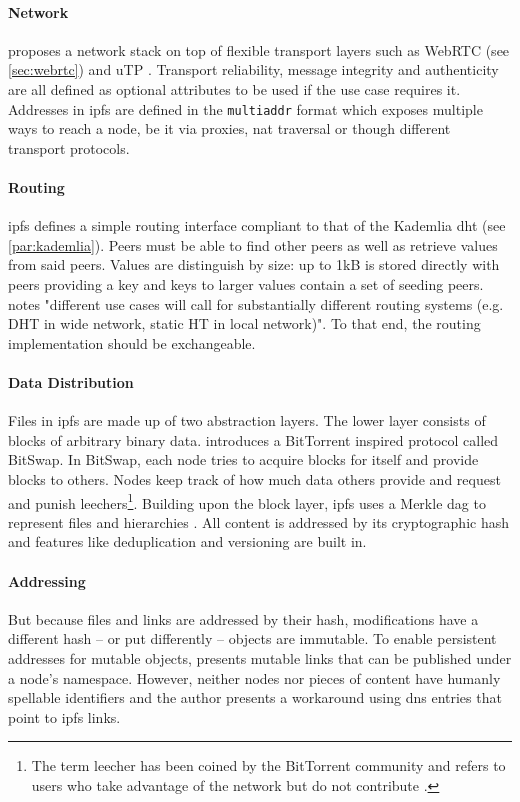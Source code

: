 \paragraph{Network}
\citet[\S3.2]{ipfs-whitepaper} proposes a network stack on top of flexible transport layers such as WebRTC (see \vref{sec:webrtc}) and uTP \cite{utp-micro-torrent-transport-protocol}. Transport reliability, message integrity and authenticity are all defined as optional attributes to be used if the use case requires it. Addresses in \gls{ipfs} are defined in the \lstinline|multiaddr| format which exposes multiple ways to reach a node, be it via proxies, \gls{nat} traversal or though different transport protocols.

\paragraph{Routing}
\gls{ipfs} defines a simple routing interface compliant to that of the Kademlia \gls{dht} (see \vref{par:kademlia}). Peers must be able to find other peers as well as retrieve values from said peers. Values are distinguish by size: up to 1kB is stored directly with peers providing a key and keys to larger values contain a set of seeding peers. \citet[\S3.5]{ipfs-whitepaper} notes "different use cases will call for substantially different routing systems (e.g. DHT in wide network, static HT in local network)". To that end, the routing implementation should be exchangeable.

\paragraph{Data Distribution}
Files in \gls{ipfs} are made up of two abstraction layers. The lower layer consists of blocks of arbitrary binary data. \citet[\S3.4]{ipfs-whitepaper} introduces a BitTorrent inspired protocol called BitSwap. In BitSwap, each node tries to acquire blocks for itself and provide blocks to others. Nodes keep track of how much data others provide and request and punish leechers\footnote{The term leecher has been coined by the BitTorrent community and refers to users who take advantage of the network but do not contribute \cite[\S7.5]{tanenbaum_wetherall_2011}.}. Building upon the block layer, \gls{ipfs} uses a Merkle \gls{dag} to represent files and hierarchies \cite[\S3.5]{ipfs-whitepaper}. All content is addressed by its cryptographic hash \cite{content-centric-networking} and features like deduplication and versioning are built in.

\paragraph{Addressing}
But because files and links are addressed by their hash, modifications have a different hash – or put differently – objects are immutable. To enable persistent addresses for mutable objects, \citet[\S3.7]{ipfs-whitepaper} presents mutable links that can be published under a node's namespace. However, neither nodes nor pieces of content have humanly spellable identifiers and the author presents a workaround using \gls{dns} entries that point to \gls{ipfs} links.
